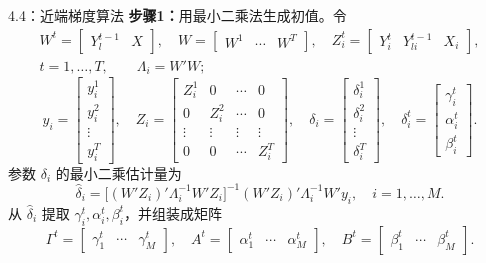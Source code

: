 \begin{bookalgorithm}{4.4：近端梯度算法}
\textbf{步骤1：}用最小二乘法生成初值。令
\[
\begin{gathered}
W^t=\begin{bmatrix}Y_l^{t-1}&X\end{bmatrix},\quad
W=\begin{bmatrix}W^1&\cdots&W^T\end{bmatrix},\quad
Z_i^t=\begin{bmatrix}Y_i^t&Y_{li}^{t-1}&X_i\end{bmatrix},\\
t=1,\ldots,T,\qquad\Lambda_i=W'W;
\end{gathered}
\]
\[
y_i=\begin{bmatrix}y_i^1\\y_i^2\\\vdots\\y_i^T\end{bmatrix},\quad
Z_i=\begin{bmatrix}Z_i^1&0&\cdots&0\\0&Z_i^2&\cdots&0\\\vdots&\vdots&\vdots&\vdots\\0&0&\cdots&Z_i^T\end{bmatrix},\quad
\delta_i=\begin{bmatrix}\delta_i^1\\\delta_i^2\\\vdots\\\delta_i^T\end{bmatrix},\quad
\delta_i^t=\begin{bmatrix}\gamma_i^t\\\alpha_i^t\\\beta_i^t\end{bmatrix}.
\]
参数 $\delta_i$ 的最小二乘估计量为
\begin{equation}
\widehat\delta_i=
\bigl[(W'Z_i)'\Lambda_i^{-1}W'Z_i\bigr]^{-1}
(W'Z_i)'\Lambda_i^{-1}W'y_i,\quad i=1,\ldots,M.\tag{4.215}
\end{equation}
从 $\widehat\delta_i$ 提取 $\gamma_i^t,\alpha_i^t,\beta_i^t$，并组装成矩阵
\[
\Gamma^t=\begin{bmatrix}\gamma_1^t&\cdots&\gamma_M^t\end{bmatrix},\quad
A^t=\begin{bmatrix}\alpha_1^t&\cdots&\alpha_M^t\end{bmatrix},\quad
B^t=\begin{bmatrix}\beta_1^t&\cdots&\beta_M^t\end{bmatrix}.
\]
\end{bookalgorithm}
